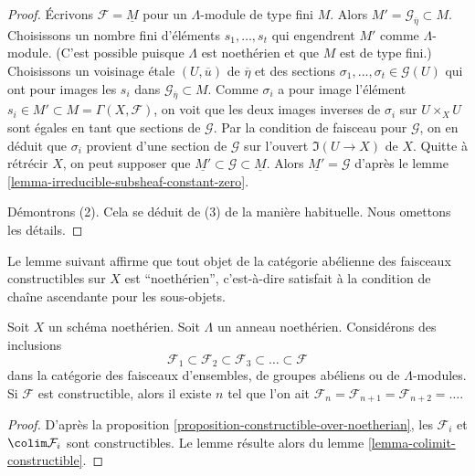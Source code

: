 \begin{proof}
\medskip\noindent
Écrivons $\mathcal{F} = \underline{M}$ pour un $\Lambda$-module de type fini $M$.
Alors $M' = \mathcal{G}_{\overline{\eta}} \subset M$. Choisissons un nombre fini
d'éléments $s_1, \ldots, s_t$ qui engendrent $M'$ comme $\Lambda$-module.
(C'est possible puisque $\Lambda$ est noethérien et que $M$ est de type fini.)
Choisissons un voisinage \'etale $(U, \overline{u})$ de $\overline{\eta}$
et des sections $\sigma_1, \ldots, \sigma_t \in \mathcal{G}(U)$ qui ont pour images
les $s_i$ dans $\mathcal{G}_{\overline{\eta}} \subset M$.
Comme $\sigma_i$ a pour image l'élément
$s_i \in M' \subset M = \Gamma(X, \mathcal{F})$,
on voit que les deux images inverses de $\sigma_i$ sur $U \times_X U$
sont égales en tant que sections de $\mathcal{G}$. Par la condition de faisceau
pour $\mathcal{G}$, on en déduit que $\sigma_i$ provient d'une section
de $\mathcal{G}$ sur l'ouvert $\Im(U \to X)$ de $X$.
Quitte à rétrécir $X$, on peut supposer que
$\underline{M'} \subset \mathcal{G} \subset \underline{M}$.
Alors $\underline{M'} = \mathcal{G}$ d'après le
lemme \ref{lemma-irreducible-subsheaf-constant-zero}.

\medskip\noindent
Démontrons (2). Cela se déduit de (3) de la manière habituelle. Nous omettons
les détails.
\end{proof}

\noindent
Le lemme suivant affirme que tout objet de la catégorie abélienne des
faisceaux constructibles sur $X$ est ``noethérien'', c'est-à-dire satisfait
à la condition de chaîne ascendante pour les sous-objets.

\begin{lemma}
\label{lemma-constructible-over-noetherian-noetherian}
Soit $X$ un schéma noethérien. Soit $\Lambda$ un anneau noethérien.
Considérons des inclusions
$$
\mathcal{F}_1 \subset \mathcal{F}_2 \subset \mathcal{F}_3 \subset \ldots
\subset \mathcal{F}
$$
dans la catégorie des faisceaux d'ensembles, de groupes abéliens ou de $\Lambda$-modules.
Si $\mathcal{F}$ est constructible, alors il existe $n$ tel que
l'on ait $\mathcal{F}_n = \mathcal{F}_{n + 1} = \mathcal{F}_{n + 2} = \ldots$.
\end{lemma}

\begin{proof}
D'après la proposition \ref{proposition-constructible-over-noetherian},
les $\mathcal{F}_i$ et $\colim \mathcal{F}_i$ sont constructibles.
Le lemme résulte alors du
lemme \ref{lemma-colimit-constructible}.
\end{proof}

